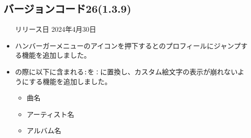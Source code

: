 \subsection*{バージョンコード26(1.3.9)}
\begin{itemize}
    \item[リリース日] 2024年4月30日
\end{itemize}

\new
\begin{itemize}
    \item ハンバーガーメニューのアイコンを押下すると\mi のプロフィールにジャンプする機能を追加しました。
    \item \nowplaying の際に以下に含まれる\verb|:|を\verb|：|に置換し、カスタム絵文字の表示が崩れないようにする機能を追加しました。
        \begin{itemize}
            \item 曲名
            \item アーティスト名
            \item アルバム名
        \end{itemize}
\end{itemize}

\change

\fix

